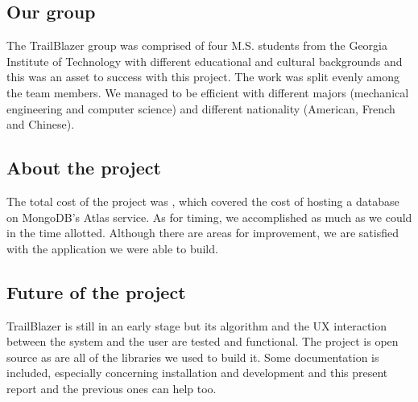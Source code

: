 \documentclass[sigconf]{acmart}
\begin{document}
\subsection{Our group}
The TrailBlazer group was comprised of four M.S. students from the Georgia Institute of Technology with different educational and cultural backgrounds and this was an asset to success with this project. The work was split evenly among the team members. We managed to be efficient with different majors (mechanical engineering and computer science) and different nationality (American, French and Chinese).



\subsection{About the project}
The total cost of the project was , which covered the cost of hosting a database on MongoDB's Atlas service. As for timing, we accomplished as much as we could in the time allotted. Although there are areas for improvement, we are satisfied with the application we were able to build.





\subsection{Future of the project}

TrailBlazer is still in an early stage but its algorithm and the UX interaction between the system and the user are tested and functional. The project is open source as are all of the libraries we used to build it. Some documentation is included, especially concerning installation and development and this present report and the previous ones can help too.
\end{document}
